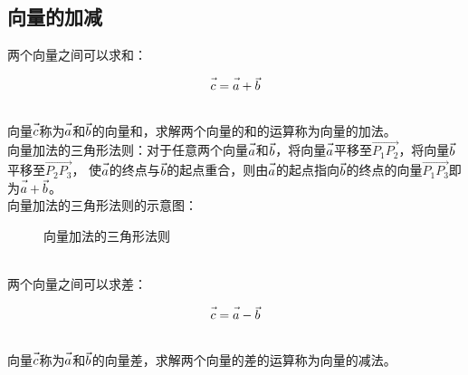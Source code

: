 \documentclass[UTF8]{ctexart}
\let\nvec\vec
\def\vec#1{\nvec{\vphantom b\smash{#1}}}
\begin{document}
\newpage

\subsection{向量的加减}
    两个向量之间可以求和：
    \begin{large}
        \begin{equation*}
            \vec{c}=\vec{a}+\vec{b}
        \end{equation*}
    \end{large}\\
    向量$\vec{c}$称为$\vec{a}$和$\vec{b}$的向量和，求解两个向量的和的运算称为向量的加法。\\[3mm]
    向量加法的三角形法则：对于任意两个向量$\vec{a}$和$\vec{b}$，将向量$\vec{a}$平移至$\overrightarrow{P_1P_2}$，将向量$\vec{b}$平移至$\overrightarrow{P_2P_3}$，
    使$\vec{a}$的终点与$\vec{b}$的起点重合，则由$\vec{a}$的起点指向$\vec{b}$的终点的向量$\overrightarrow{P_1P_3}$即为$\vec{a}+\vec{b}$。\\[3mm]
    向量加法的三角形法则的示意图：
    \begin{figure}[h]
        \begin{center}
            \caption{向量加法的三角形法则}
        \end{center}
    \end{figure}\\
    两个向量之间可以求差：
    \begin{large}
        \begin{equation*}
            \vec{c}=\vec{a}-\vec{b}
        \end{equation*}
    \end{large}\\
    向量$\vec{c}$称为$\vec{a}$和$\vec{b}$的向量差，求解两个向量的差的运算称为向量的减法。\\[3mm]
\end{document}
